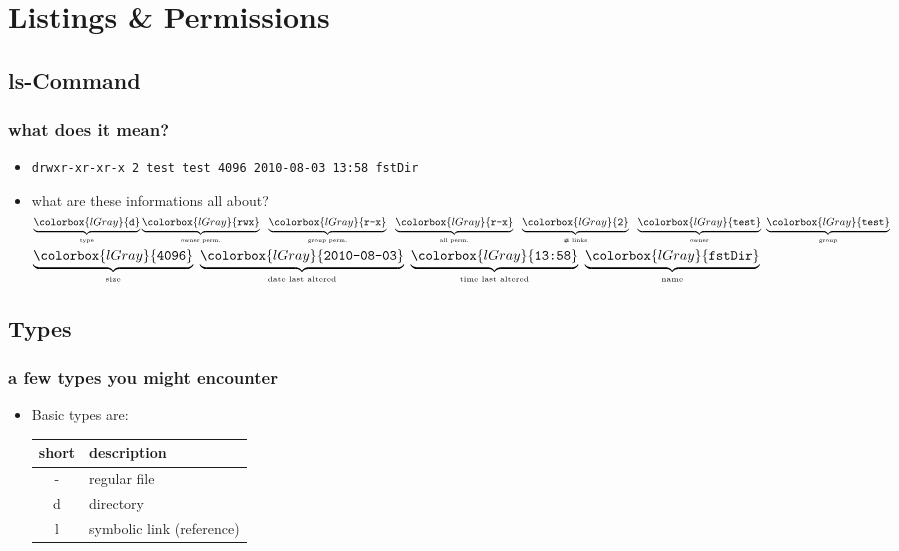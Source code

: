 \documentclass[handout]{beamer}
\newcommand{\code}[1]{\colorbox{lGray}{\texttt{#1}}}
\begin{document}
\section{Listings \& Permissions}
    \subsection{ls-Command}
       \begin{frame}[fragile]
			\frametitle{what does it mean?}
			\begin{itemize}
                \item<1-> \code{drwxr-xr-xr-x 2 test test 4096 2010-08-03 13:58 fstDir}
				\item<2-> what are these informations all about?\\
                $\underbrace{\code{d}}_{\text{\tiny{type}}}
                \underbrace{\code{rwx}}_{\text{\tiny{owner perm.}}}\ \ 
                \underbrace{\code{r-x}}_{\text{\tiny{group perm.}}}\ \ 
                \underbrace{\code{r-x}}_{\text{\tiny{all perm.}}}\ \
                \underbrace{\code{2}}_{\text{\tiny{\# links}}}\ \ 
                \underbrace{\code{test}}_{\text{\tiny{owner}}}\ 
                \underbrace{\code{test}}_{\text{\tiny{group}}}$ \\
                $\underbrace{\code{4096}}_{\text{\tiny{size}}}\ 
                \underbrace{\code{2010-08-03}}_{\text{\tiny{date last altered}}}\ 
                \underbrace{\code{13:58}}_{\text{\tiny{time last altered}}}\ 
                \underbrace{\code{fstDir}}_{\text{\tiny{name}}}$
            \end{itemize}
		\end{frame}
    \subsection{Types}
        \begin{frame}
			\frametitle{a few types you might encounter}
			\begin{itemize}
                \item<1-> Basic types are: \\
                \begin{tabular}{cl}
                    short & description \\ \hline
                    - & regular file \\
                    d & directory \\
                    l & symbolic link (reference)
                \end{tabular}
            \end{itemize}
		\end{frame}
\end{document}
